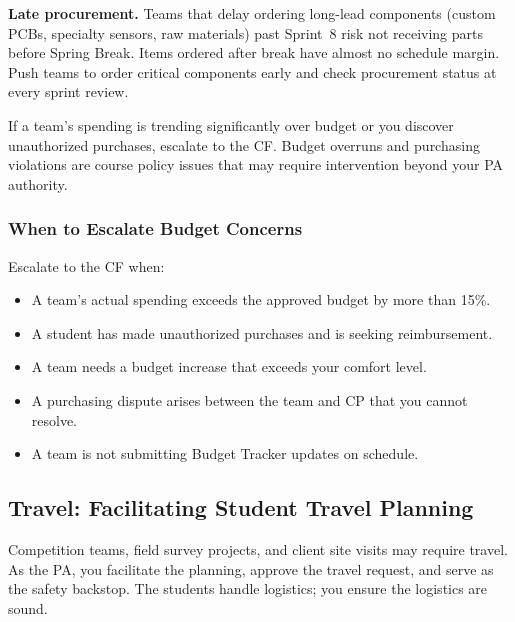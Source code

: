 \begin{redflag}
\textbf{Late procurement.} Teams that delay ordering long-lead components (custom PCBs, specialty sensors, raw materials) past Sprint~8 risk not receiving parts before Spring Break. Items ordered after break have almost no schedule margin. Push teams to order critical components early and check procurement status at every sprint review.
\end{redflag}

\begin{warnbox}
If a team's spending is trending significantly over budget or you discover unauthorized purchases, escalate to the CF. Budget overruns and purchasing violations are course policy issues that may require intervention beyond your PA authority.
\end{warnbox}

\subsubsection{When to Escalate Budget Concerns}

Escalate to the CF when:

\begin{itemize}[nosep,leftmargin=1.5em]
\item A team's actual spending exceeds the approved budget by more than 15\%.
\item A student has made unauthorized purchases and is seeking reimbursement.
\item A team needs a budget increase that exceeds your comfort level.
\item A purchasing dispute arises between the team and CP that you cannot resolve.
\item A team is not submitting Budget Tracker updates on schedule.
\end{itemize}


\subsection{Travel: Facilitating Student Travel Planning}

Competition teams, field survey projects, and client site visits may require travel. As the PA, you facilitate the planning, approve the travel request, and serve as the safety backstop. The students handle logistics; you ensure the logistics are sound.

